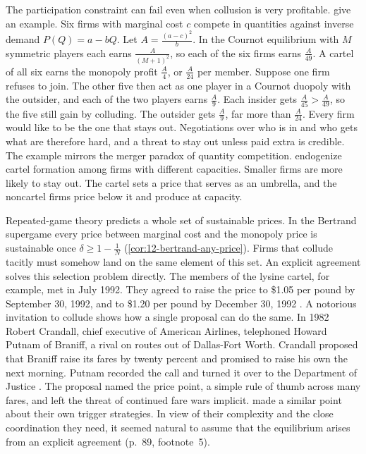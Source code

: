 The participation constraint can fail even when collusion is very profitable. \citet[pp.~192--193]{AskerNocke2021}
give an example. Six firms with marginal cost $c$ compete in quantities against inverse demand $P(Q) = a - bQ$. Let
$A = \frac{(a - c)^2}{b}$. In the Cournot equilibrium with $M$ symmetric players each earns $\frac{A}{(M + 1)^2}$, so
each of the six firms earns $\frac{A}{49}$. A cartel of all six earns the monopoly profit $\frac{A}{4}$, or $\frac{A}{24}$
per member. Suppose one firm refuses to join. The other five then act as one player in a Cournot duopoly with the
outsider, and each of the two players earns $\frac{A}{9}$. Each insider gets $\frac{A}{45} > \frac{A}{49}$, so the
five still gain by colluding. The outsider gets $\frac{A}{9}$, far more than $\frac{A}{24}$. Every firm would like to be
the one that stays out. Negotiations over who is in and who gets what are therefore hard, and a threat to stay out
unless paid extra is credible. The example mirrors the merger paradox of quantity competition. \citet{BosHarrington2010}
endogenize cartel formation among firms with different capacities. Smaller firms are more likely to stay out. The
cartel sets a price that serves as an umbrella, and the noncartel firms price below it and produce at capacity.

Repeated-game theory predicts a whole set of sustainable prices. In the Bertrand supergame every price between
marginal cost and the monopoly price is sustainable once $\delta \ge 1 - \frac{1}{N}$
(\cref{cor:12-bertrand-any-price}). Firms that collude tacitly must somehow land on the same element of this set.
An explicit agreement solves this selection problem directly. The members of the lysine cartel, for example, met
in July 1992. They agreed to raise the price to \$1.05 per pound by September 30, 1992, and to \$1.20 per pound by
December 30, 1992 \citep[p.~2426]{HarringtonSkrzypacz2011}. A notorious invitation to collude shows how a single
proposal can do the same. In 1982 Robert Crandall, chief executive of American Airlines, telephoned Howard Putnam of
Braniff, a rival on routes out of Dallas-Fort Worth. Crandall proposed that Braniff raise its fares by twenty percent
and promised to raise his own the next morning. Putnam recorded the call and turned it over to the Department of
Justice \citep[pp.~188--189]{AskerNocke2021}. The proposal named the price point, a simple rule of thumb across many
fares, and left the threat of continued fare wars implicit. \citet{GreenPorter1984} made a similar point about their
own trigger strategies. In view of their complexity and the close coordination they need, it seemed natural to
assume that the equilibrium arises from an explicit agreement (p.~89, footnote~5).

